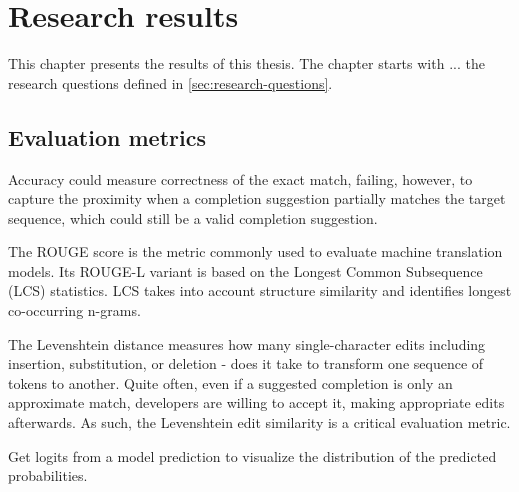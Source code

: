 \chapter{Research results}
\label{chap:results}
This chapter presents the results of this thesis. The chapter starts with ... the research questions defined in \cref{sec:research-questions}.

\section{Evaluation metrics}
Accuracy could measure correctness of the exact match, failing, however, to capture the proximity when a completion suggestion partially matches the target sequence, which could still be a valid completion suggestion.

The ROUGE score is the metric commonly used to evaluate machine translation models. Its ROUGE-L variant is based on the Longest Common Subsequence (LCS) statistics. LCS takes into account structure similarity and identifies longest co-occurring n-grams.

The Levenshtein distance measures how many single-character edits  including insertion, substitution, or deletion - does it take to transform one sequence of tokens to another. Quite often, even if a suggested completion is only an approximate match, developers are willing to accept it, making appropriate edits afterwards. As such, the Levenshtein edit similarity is a critical evaluation metric.


Get logits from a model  prediction to visualize the distribution of the predicted probabilities.